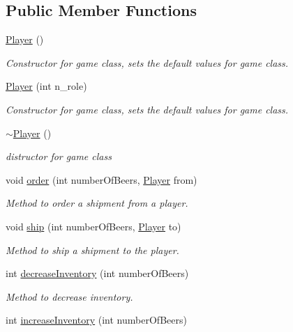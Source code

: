 \subsection*{Public Member Functions}
\begin{DoxyCompactItemize}
\item 
\hyperlink{class_player_affe0cc3cb714f6deb4e62f0c0d3f1fd8}{Player} ()
\begin{DoxyCompactList}\small\item\em Constructor for game class, sets the default values for game class. \end{DoxyCompactList}\item 
\hyperlink{class_player_a8fd722300bd72d1d043e789e7ed2a39b}{Player} (int n\+\_\+role)
\begin{DoxyCompactList}\small\item\em Constructor for game class, sets the default values for game class. \end{DoxyCompactList}\item 
\hyperlink{class_player_a749d2c00e1fe0f5c2746f7505a58c062}{$\sim$\+Player} ()
\begin{DoxyCompactList}\small\item\em distructor for game class \end{DoxyCompactList}\item 
void \hyperlink{class_player_a473d9c248207e213abc5575859a51c1b}{order} (int number\+Of\+Beers, \hyperlink{class_player}{Player} from)
\begin{DoxyCompactList}\small\item\em Method to order a shipment from a player. \end{DoxyCompactList}\item 
void \hyperlink{class_player_a68db574596d1ca040f454d34310149ee}{ship} (int number\+Of\+Beers, \hyperlink{class_player}{Player} to)
\begin{DoxyCompactList}\small\item\em Method to ship a shipment to the player. \end{DoxyCompactList}\item 
int \hyperlink{class_player_ae2197d1061a24fa444129b5ea85996d5}{decrease\+Inventory} (int number\+Of\+Beers)
\begin{DoxyCompactList}\small\item\em Method to decrease inventory. \end{DoxyCompactList}\item 
int \hyperlink{class_player_af67e6ee0de38f3e9635d35849f103449}{increase\+Inventory} (int number\+Of\+Beers)

\end{DoxyCompactItemize}
